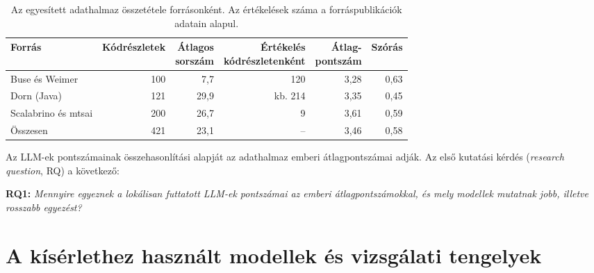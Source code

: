\documentclass[
]{elteikthesis}[2024/04/26]
\begin{document}
\begin{table}[htb]
	\centering
	\small
	\setlength{\tabcolsep}{4pt}
	\begin{tabular}{ | l | r | r | r | r | r | }
		\hline
		\textbf{Forrás} &
		\textbf{Kódrészletek} &
		\makecell{\textbf{Átlagos}\\\textbf{sorszám}} &
		\makecell{\textbf{Értékelés}\\\textbf{kódrészletenként}} &
		\makecell{\textbf{Átlag-}\\\textbf{pontszám}} &
		\textbf{Szórás} \\
		\hline \hline
		Buse és Weimer & 100 & 7,7 & 120 & 3,28 & 0,63 \\
		\hline
		Dorn (Java) & 121 & 29,9 & kb. 214 & 3,35 & 0,45 \\
		\hline
		Scalabrino és mtsai & 200 & 26,7 & 9 & 3,61 & 0,59 \\
		\hline \hline
		Összesen & 421 & 23,1 & -- & 3,46 & 0,58 \\
		\hline
	\end{tabular}
	\caption[Az egyesített adathalmaz összetétele]{Az egyesített adathalmaz
	összetétele forrásonként. Az értékelések száma a forráspublikációk adatain
	alapul.}
	\label{tab:method:dataset}
\end{table}

Az LLM-ek pontszámainak összehasonlítási alapját az adathalmaz emberi
átlagpontszámai adják. %
Az első kutatási kérdés (\textit{research question}, RQ) a következő:

\textbf{RQ1:} \textit{Mennyire egyeznek %
a lokálisan futtatott %
LLM-ek pontszámai az emberi átlagpontszámokkal, és mely modellek mutatnak jobb,
illetve rosszabb egyezést?} %

\section{A kísérlethez használt modellek és vizsgálati tengelyek}
\label{sec:method:models}
\end{document}
